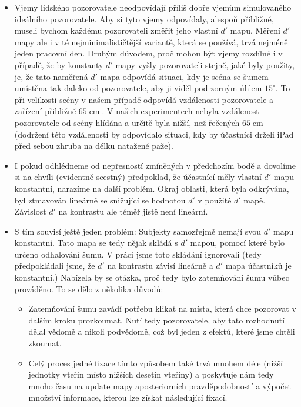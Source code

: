 \begin{itemize}

\item Vjemy lidského pozorovatele neodpovídají příliš dobře vjemům simulovaného
ideálního pozorovatele. Aby si tyto vjemy odpovídaly, alespoň přibližné, museli
bychom každému pozorovateli změřit jeho vlastní $d'$ mapu. Měření $d'$ mapy ale
i  v té nejminimalističtější variantě, která se používá, trvá nejméně jeden
pracovní den. Druhým důvodem, proč mohou být vjemy rozdílné i v případě, že by
konstanty $d'$ mapy vyšly pozorovateli stejně, jaké byly použity, je, že tato
naměřená $d'$ mapa odpovídá situaci, kdy je scéna se šumem umístěna tak daleko
od pozorovatele, aby ji viděl pod zorným úhlem $15^\circ$. To při velikosti
scény v našem případě odpovídá vzdálenosti pozorovatele a zařízení přibližně
$65 \operatorname{cm}$. V našich experimentech nebyla vzdálenost pozorovatele od
scény hlídána a určitě byla nižší, než řečených $65 \operatorname{cm}$
(dodržení této vzdálenosti by odpovídalo situaci, kdy by účastníci drželi iPad
před sebou zhruba na délku natažené paže). 

\item I pokud odhlédneme od nepřesností zmíněných v předchozím bodě a dovolíme
si na chvíli (evidentně scestný) předpoklad, že účastnící měly vlastní $d'$ mapu
konstantní, narazíme na další problém. Okraj oblasti, která byla odkrývána,
byl ztmavován lineárně se snižující se hodnotou $d'$ v použité $d'$ mapě.
Závislost $d'$ na kontrastu ale téměř jistě
není lineární.

\item S tím souvisí ještě jeden problém: Subjekty samozřejmě nemají svou $d'$
mapu konstantní. Tato mapa se tedy nějak skládá s $d'$ mapou, pomocí které
bylo určeno odhalování šumu. V práci jsme toto skládání ignorovali (tedy
předpokládali jsme, že $d'$ na kontrastu závisí lineárně a $d'$ mapa účastníků
je konstantní.) Nabízela by se otázka, proč tedy bylo zatemňování šumu vůbec
prováděno. To se dělo z několika důvodů:

\begin{itemize}

\item Zatemňování šumu zavádí potřebu klikat na místa, která chce pozorovat v
dalším kroku prozkoumat. Nutí tedy pozorovatele, aby tato rozhodnutí dělal
vědomě a nikoli podvědomě, což byl jeden z efektů, které jsme chtěli zkoumat.

\item Celý proces jedné fixace tímto způsobem také trvá mnohem déle (nižší
jednotky vteřin místo nižších desetin vteřiny) a poskytuje nám tedy mnoho času
na update mapy aposteriorních pravděpodobností a výpočet množství informace,
kterou lze získat následující fixací.


\end{itemize}
\end{itemize}
